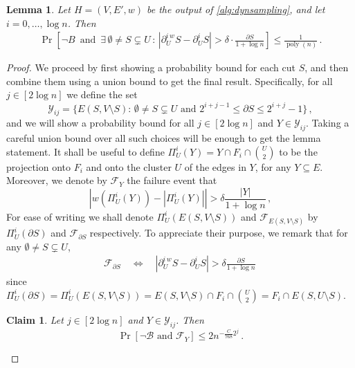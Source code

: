\documentclass[epsfig,letter,11pt]{article}
\numberwithin{equation}{section}
\newcommand{\uncutg}[1]{{\partial} #1}
\newcommand{\iuncut}[2]{{\partial}_{#2}^{i} #1}
\newcommand{\iwcut}[2]{{\partial}_{#2}^{i \,w} #1}
\DeclareMathOperator*{\poly}{poly}
\newtheorem{lemma}[theorem]{Lemma}
\newtheorem{claim}[theorem]{Claim}
\begin{document}
\begin{lemma} \label{lem:levelbound}
	Let $H=(V,E',w)$ be the output of \cref{alg:dynsampling}, and let $i =0,\dots,\log n$. Then
	\begin{align*}
		\Pr\left[ \neg B\,  \text{ and }\, \exists \, \emptyset \neq S \subsetneq U \, : \,  \left|\iwcut{S}{U} - \iuncut{S}{U}\right| > \delta \cdot \frac{\uncutg{S}}{1+\log n} \right] \le \frac{1}{\poly(n)}
		\, .
	\end{align*}
\end{lemma}
\begin{proof}
We proceed by first showing a probability bound for each cut $S$, and then combine them using a union bound to get the final result. Specifically, for all $j \in [2\log n]$ we define the set
\begin{equation*}
	\mathcal{Y}_{ij}=\{E(S,V \setminus S) : \, \emptyset \neq S \subsetneq U \text{ and } 2^{i+j-1} \le \uncutg{S} \le 2^{i+j}-1 \} \, ,
\end{equation*}
and we will show a probability bound for all $j \in [2\log n]$ and $Y \in \mathcal{Y}_{ij}$. Taking a careful union bound over all such choices will be enough to get the lemma statement. It shall be useful to define $\Pi_U^i(Y)=Y \cap F_i \cap \binom{U}{2}$ to be the projection onto $F_i$ and onto the cluster $U$ of the edges in $Y$, for any $Y \subseteq E$. Moreover, we denote by $\mathcal{F}_{Y}$ the failure event that
\begin{equation*}
	\left|w(\Pi_U^{i}(Y)) - |\Pi_U^{i}(Y)|\right| > \delta \frac{|Y|}{1+\log n} \, ,
\end{equation*}
For ease of writing we shall denote $\Pi_U^i(E(S,V \setminus S))$ and $\mathcal{F}_{E(S,V \setminus S)}$ by $\Pi_U^i(\uncutg{S})$ and $\mathcal{F}_{\uncutg{S}}$ respectively. To appreciate their purpose, we remark that for any $\emptyset \neq S \subsetneq U$,
\begin{align*}
	\mathcal{F}_{\uncutg{S}} \quad \iff \quad \left|\iwcut{S}{U} - \iuncut{S}{U}\right| > \delta \frac{\uncutg{S}}{1+\log n} \, 
\end{align*}
since $\Pi_U^{i}(\uncutg{S})=\Pi_U^{i}(E(S,V \setminus S)) = E(S,V \setminus S) \cap F_i \cap \binom{U}{2} = F_i \cap E(S,U\setminus S)$.

\begin{claim}
	\label{claim:boundprobsingleset}
	Let $j \in [2\log n]$ and $Y \in \mathcal{Y}_{ij}$. Then
	\begin{equation*}
		\Pr[\neg \mathcal{B} \text{ and } \mathcal{F}_Y] \le 2n^{-\frac{C}{768}2^j} \, .
	\end{equation*}
\end{claim}


\end{proof}
\end{document}
